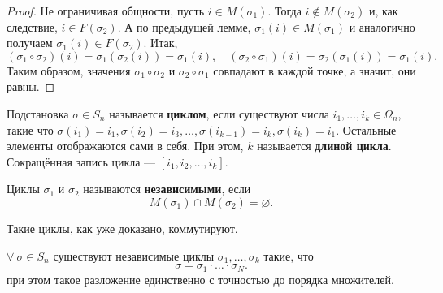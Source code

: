 \begin{remark}
\begin{proof}
        Не ограничивая общности, пусть $i \in M(\sigma_1)$. Тогда $i \notin M(\sigma_2)$ и, как следствие, $i \in F(\sigma_2)$. А по предыдущей лемме, $\sigma_1(i) \in M(\sigma_1)$ и аналогично получаем $\sigma_1(i) \in F(\sigma_2)$. Итак,
        $$
        (\sigma_1 \circ \sigma_2)(i) = \sigma_1(\sigma_2(i)) = \sigma_1(i),\quad(\sigma_2 \circ \sigma_1)(i) = \sigma_2(\sigma_1(i)) = \sigma_1(i).
        $$
        Таким образом, значения $\sigma_1 \circ \sigma_2$ и $\sigma_2 \circ \sigma_1$ совпадают в каждой точке, а значит, они равны.
    \end{proof}
\end{remark}

\begin{definition}
    Подстановка $\sigma \in S_n$ называется \textbf{циклом}, если существуют числа $i_1, \ldots, i_k \in \Omega_n$, такие что $\sigma(i_1) = i_1, \sigma(i_2) = i_3, \ldots, \sigma(i_{k - 1}) = i_k, \sigma(i_k) = i_1$. Остальные элементы отображаются сами в себя. При этом, $k$ называется \textbf{длиной цикла}. Сокращённая запись цикла --- $[i_1, i_2, \ldots, i_k]$.
\end{definition}

\begin{definition}
    Циклы $\sigma_1$ и $\sigma_2$ называются \textbf{независимыми}, если
    $$
    M(\sigma_1) \cap M(\sigma_2) = \varnothing.
    $$
\end{definition}

\begin{remark}
    Такие циклы, как уже доказано, коммутируют.
\end{remark}

\begin{theorem}
    $\forall\!\:\sigma \in S_n$ существуют независимые циклы $\sigma_1, \ldots, \sigma_k$ такие, что
    $$
    \sigma = \sigma_1 \cdot \ldots \cdot \sigma_N.
    $$
    при этом такое разложение единственно с точностью до порядка множителей.
\end{theorem}

